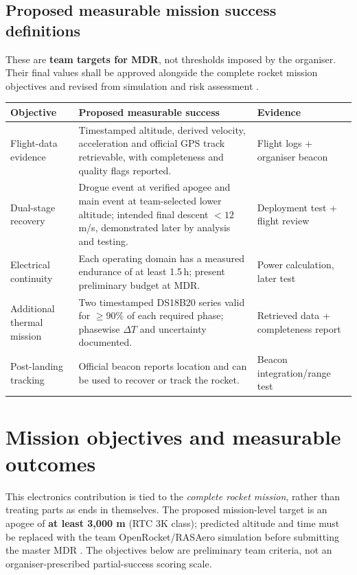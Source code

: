 \subsection*{Proposed measurable mission success definitions}
These are \textbf{team targets for MDR}, not thresholds imposed by the organiser. Their final values shall be approved alongside the complete rocket mission objectives and revised from simulation and risk assessment \cite{rtc2027app01,rtc2027app07}.
\small
\begin{tabularx}{\linewidth}{@{}L{32mm}Y L{37mm}@{}}
\toprule{}\textbf{Objective}&\textbf{Proposed measurable success}&\textbf{Evidence}\\\midrule
Flight-data evidence & Timestamped altitude, derived velocity, acceleration and official GPS track retrievable, with completeness and quality flags reported. & Flight logs + organiser beacon\\
Dual-stage recovery & Drogue event at verified apogee and main event at team-selected lower altitude; intended final descent $<12$\,m/s, demonstrated later by analysis and testing. & Deployment test + flight review\\
Electrical continuity & Each operating domain has a measured endurance of at least 1.5\,h; present preliminary budget at MDR. & Power calculation, later test\\
Additional thermal mission & Two timestamped DS18B20 series valid for $\ge90\%$ of each required phase; phasewise $\Delta T$ and uncertainty documented. & Retrieved data + completeness report\\
Post-landing tracking & Official beacon reports location and can be used to recover or track the rocket. & Beacon integration/range test\\
\bottomrule
\end{tabularx}
\normalsize


\section{Mission objectives and measurable outcomes}
\label{sec:missionobjectives}
This electronics contribution is tied to the \emph{complete rocket mission}, rather than treating parts as ends in themselves. The proposed mission-level target is an apogee of \textbf{at least 3,000 m} (RTC 3K class); predicted altitude and time must be replaced with the team OpenRocket/RASAero simulation before submitting the master MDR \cite{rtc2027app03,rtc2027app01}. The objectives below are preliminary team criteria, not an organiser-prescribed partial-success scoring scale.

